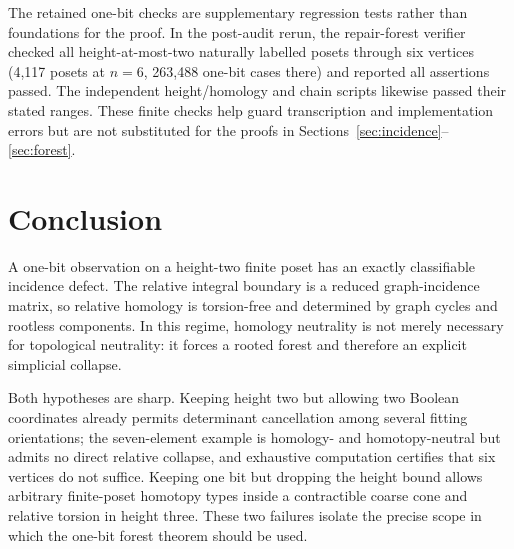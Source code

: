 \documentclass[11pt]{article}
\theoremstyle{definition}
\theoremstyle{remark}
\begin{document}
The retained one-bit checks are supplementary regression tests rather than foundations
for the proof.  In the post-audit rerun, the repair-forest verifier checked all
height-at-most-two naturally labelled posets through six vertices (4,117 posets at
$n=6$, 263,488 one-bit cases there) and reported all assertions passed.  The independent
height/homology and chain scripts likewise passed their stated ranges.  These finite
checks help guard transcription and implementation errors but are not substituted for
the proofs in Sections~\ref{sec:incidence}--\ref{sec:forest}.

\section{Conclusion}\label{sec:conclusion}

A one-bit observation on a height-two finite poset has an exactly classifiable
incidence defect.  The relative integral boundary is a reduced graph-incidence matrix,
so relative homology is torsion-free and determined by graph cycles and rootless
components.  In this regime, homology neutrality is not merely necessary for topological
neutrality: it forces a rooted forest and therefore an explicit simplicial collapse.

Both hypotheses are sharp.  Keeping height two but allowing two Boolean coordinates
already permits determinant cancellation among several fitting orientations; the
seven-element example is homology- and homotopy-neutral but admits no direct relative
collapse, and exhaustive computation certifies that six vertices do not suffice.
Keeping one bit but dropping the height bound allows arbitrary finite-poset homotopy
types inside a contractible coarse cone and relative torsion in height three.  These
two failures isolate the precise scope in which the one-bit forest theorem should be
used.
\end{document}
